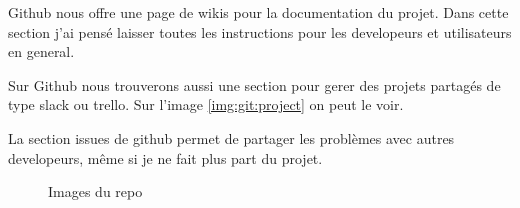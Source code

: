\documentclass[12pt]{article}
\begin{document}
\begin{par}
	Github nous offre une page de wikis pour la
	documentation du projet. Dans cette section j'ai 
	pens\'e laisser toutes les instructions pour les 
	developeurs et utilisateurs en general.
\end{par}
\begin{par}
	Sur Github nous trouverons aussi une section pour
	gerer des projets partag\'es de type slack ou
	trello. Sur l'image \ref{img:git:project} on peut
	le voir.
\end{par}

\begin{par}
	La section issues de github permet de partager les
	probl\`emes avec autres developeurs, m\^eme si je
	ne fait plus part du projet.
\end{par}

\begin{figure}[!htb]
	\centering
	\caption{Images du repo}
	\label{img:git_all}
\end{figure}

\end{document}

